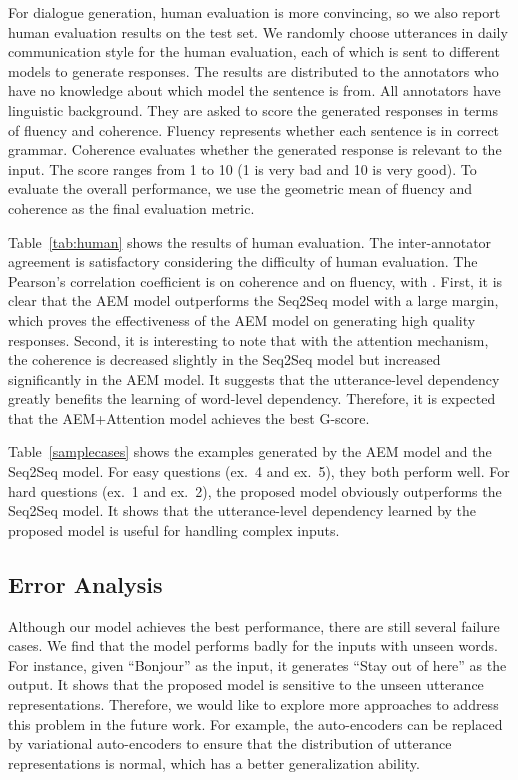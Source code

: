 \documentclass[11pt,a4paper]{article}
\begin{document}
\begin{CJK}{UTF8}{song}
For dialogue generation, human evaluation is more convincing, so we also report human evaluation results on the test set. We randomly choose  utterances in daily communication style for the human evaluation, each of which is sent to different models to generate responses. The results are distributed to the annotators who have no knowledge about which model the sentence is from. All annotators have linguistic background. They are asked to score the generated responses in terms of fluency and coherence. Fluency represents whether each sentence is in correct grammar. Coherence evaluates whether the generated response is relevant to the input. The score ranges from 1 to 10 (1 is very bad and 10 is very good). To evaluate the overall performance, we use the geometric mean of fluency and coherence as the final evaluation metric. 

Table~\ref{tab:human} shows the results of human evaluation. The inter-annotator agreement is satisfactory considering the difficulty of human evaluation. The Pearson's correlation coefficient is  on coherence and  on fluency, with . First, it is clear that the AEM model outperforms the Seq2Seq model with a large margin, which proves the effectiveness of the AEM model on generating high quality responses. Second, it is interesting to note that with the attention mechanism, the coherence is decreased slightly in the Seq2Seq model but increased significantly in the AEM model. It suggests that the utterance-level dependency greatly benefits the learning of word-level dependency. Therefore, it is expected that the AEM+Attention model achieves the best G-score.  








Table~\ref{samplecases} shows the examples generated by the AEM model and the Seq2Seq model. For easy questions (ex.~4 and ex.~5), they both perform well. For hard questions (ex.~1 and ex.~2), the proposed model obviously outperforms the Seq2Seq model. It shows that the utterance-level dependency learned by the proposed model is useful for handling complex inputs.

\subsection{Error Analysis}
Although our model achieves the best performance, there are still several failure cases. We find that the model performs badly for the inputs with unseen words. For instance, given ``Bonjour'' as the input, it generates ``Stay out of here'' as the output. It shows that the proposed model is sensitive to the unseen utterance representations. Therefore, we would like to explore more approaches to address this problem in the future work. For example, the auto-encoders can be replaced by variational auto-encoders to ensure that the distribution of utterance representations is normal, which has a better generalization ability.   


\end{CJK}
\end{document}

